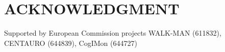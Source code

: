 \documentclass[letterpaper, 10 pt, conference]{ieeeconf}  %
\begin{document}








\section{ACKNOWLEDGMENT}
Supported by European Commission projects WALK-MAN (611832), CENTAURO (644839), CogIMon (644727)







\end{document}
